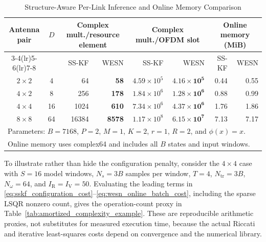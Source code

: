 \documentclass[lettersize,journal]{IEEEtran}
\begin{document}
\begin{table}[t]
\centering
\caption{Structure-Aware Per-Link Inference and Online Memory Comparison}
\label{tab:complexity_comparison}
\begin{tabular}{c c r r r r r r}
\toprule
Antenna pair
& $D$
& \multicolumn{2}{c}{Complex mult./resource element}
& \multicolumn{2}{c}{Complex mult./OFDM slot}
& \multicolumn{2}{c}{Online memory (MiB)}\\
\cmidrule(lr){3-4}\cmidrule(lr){5-6}\cmidrule(lr){7-8}
 
&
& SS-KF & WESN
& SS-KF & WESN
& SS-KF & WESN\\
\midrule
$2\times2$ & 4  & 64    & \textbf{58}   & $4.59\times10^{5}$ & $\mathbf{4.16\times10^{5}}$ & 0.44 & 0.55\\
$4\times2$ & 8  & 256   & \textbf{178}  & $1.84\times10^{6}$ & $\mathbf{1.28\times10^{6}}$ & 0.88 & 0.99\\
$4\times4$ & 16 & 1024  & \textbf{610}  & $7.34\times10^{6}$ & $\mathbf{4.37\times10^{6}}$ & 1.76 & 1.86\\
$8\times8$ & 64 & 16384 & \textbf{8578} & $1.17\times10^{8}$ & $\mathbf{6.15\times10^{7}}$ & 7.13 & 7.17\\
\midrule
\multicolumn{8}{l}{\footnotesize Parameters: $B=7168$, $P=2$, $M=1$, $K=2$, $r=1$, $R=2$, and $\phi(x)=x$.}\\
\multicolumn{8}{l}{\footnotesize Online memory uses complex64 and includes all $B$ states and input windows.}\\
\bottomrule
\end{tabular}
\end{table}

To illustrate rather than hide the configuration penalty, consider the
$4\times4$ case with $S=16$ model windows, $N_s=3B$ samples per window,
$T=4$, $N_{\mathrm{tr}}=3B$, $N_{\omega}=64$, and
$I_{\mathrm{R}}=I_{\mathrm{V}}=50$.  Evaluating the leading terms in
\eqref{eq:sskf_configuration_cost}--\eqref{eq:wesn_online_batch_cost}, including
the sparse LSQR nonzero count, gives the operation-count proxy in
Table~\ref{tab:amortized_complexity_example}.  These are reproducible
arithmetic proxies, not substitutes for measured execution time, because the
actual Riccati and iterative least-squares costs depend on convergence and the
numerical library.
\end{document}
